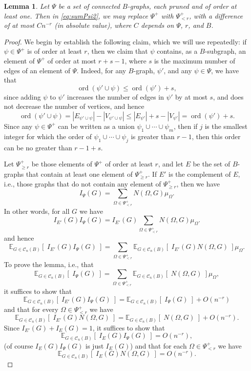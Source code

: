 \documentclass{memo-l}
\theoremstyle{plain}
\theoremstyle{definition}
\numberwithin{section}{chapter}
\numberwithin{equation}{chapter}
\newcommand{\expect}[2]{{\mathbb{E}}_{#1}{\left[\; #2\; \right]}}
\DeclareMathOperator{\ord}{ord}
\theoremstyle{plain}
\newtheorem{lem}[theorem]{Lemma}
\theoremstyle{definition}
\newcommand\cC{\mathcal{C}}
\begin{document}
\begin{lem}\label{le:indicator_less_than_r}
Let \( \Psi \) be a set of connected 
\( B \)-graphs, each pruned and of order at
least one. 
Then in \eqref{eq:sumPsi2}, we may replace \( \Psi^+ \) with \(
\Psi^+_{<r} \), with a difference of at most $C n^{-r}$
(in absolute value),
where $C$ depends on $\Psi$, $r$, and $B$.
\end{lem} 
\begin{proof}
We begin by establish the following claim, which we
will use repeatedly: if $\psi\in\Psi^+$ is
of order at least $r$, then we claim that
$\psi$ contains, as a $B$-subgraph,
an element of $\Psi^+$ of order at most $r+s-1$, where
$s$ is the maximum number of edges of an element of $\Psi$.
Indeed, for any $B$-graph, $\psi'$, and any $\psi\in\Psi$, we
have that
$$
\ord(\psi'\cup\psi)\le \ord(\psi')+s,
$$
since adding $\psi$ to $\psi'$ increases the number of edges in
$\psi'$ by at most $s$, and does not decrease the number of vertices,
and hence
$$
\ord(\psi'\cup\psi) = |E_{\psi'\cup\psi}| - |V_{\psi'\cup\psi}|
\le |E_{\psi'}|+ s - |V_{\psi'}| = \ord(\psi')+s.
$$
Since any $\psi\in\Psi^+$
can be written as a union
$\psi_1\cup\cdots\cup\psi_m$, then if $j$ is the smallest integer for which
the order of 
$\psi_1\cup\cdots\cup\psi_j$ is greater than $r-1$,
then this order can be no greater than $r-1+s$.

Let $\Psi^+_{\ge r}$ be those elements of $\Psi^+$ of order at least $r$,
and let $E$ be the set of $B$-graphs that contain at least one element
of $\Psi^+_{\ge r}$.  If $E'$ is the complement of $E$, i.e., those
graphs that do not contain any element of $\Psi^+_{\ge r}$, then we have
$$
I_\Psi(G) = \sum_{\Omega\in\Psi^+_{<r}}  N(\Omega,G) \mu_\Omega.
$$
In other words, for all $G$ we have
$$
I_{E'}(G)I_\Psi(G) = 
I_{E'}(G) \sum_{\Omega\in\Psi^+_{<r}}  N(\Omega,G) \mu_\Omega.
$$
and hence
\begin{equation}\label{eq:multiply_by_indicator_E'}
\expect{G\in\cC_n(B)}{I_{E'}(G)I_\Psi(G)} =
\sum_{\Omega\in\Psi^+_{<r}}
\expect{G\in\cC_n(B)}{I_{E'}(G)N(\Omega,G)}\mu_\Omega.
\end{equation}
To prove the lemma, i.e., that
\begin{equation}\label{eq:replace_with_less_than_r}
\expect{G\in\cC_n(B)}{I_\Psi(G)} =
\sum_{\Omega\in\Psi^+_{<r}}
\expect{G\in\cC_n(B)}{N(\Omega,G)}\mu_\Omega,
\end{equation}
it suffices to show that
$$
\expect{G\in\cC_n(B)}{I_{E'}(G)I_\Psi(G)} =
\expect{G\in\cC_n(B)}{I_\Psi(G)} + O(n^{-r})
$$
and that for every $\Omega\in\Psi^+_{<r}$ we have
$$
\expect{G\in\cC_n(B)}{I_{E'}(G)N(\Omega,G)} =
\expect{G\in\cC_n(B)}{N(\Omega,G)} + O(n^{-r}).
$$
Since $I_{E'}(G)+I_{E}(G)=1$, it suffices to show that
\begin{equation}\label{eq:unlikely_large_order}
\expect{G\in\cC_n(B)}{I_E(G) I_\Psi(G) } = O(n^{-r}) ,
\end{equation}
(of course $I_{E}(G)I_\Psi(G)$ is just $I_{E}(G)$)
and that for each $\Omega\in\Psi^+_{<r}$ we have
\begin{equation}\label{eq:unlikely_Omega}
\expect{G\in\cC_n(B)}{I_E(G) N(\Omega,G)} = O(n^{-r}) .
\end{equation}


\end{proof}
\end{document}
